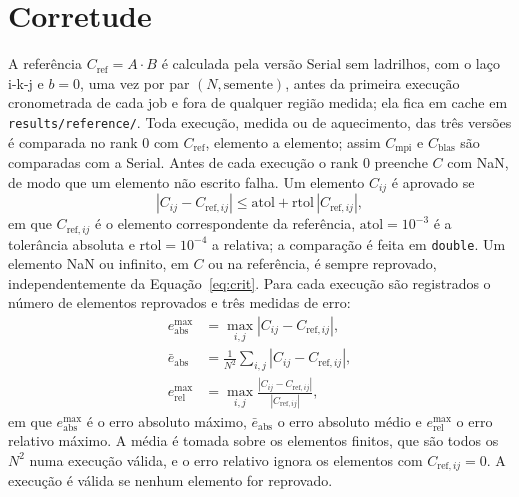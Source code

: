\documentclass[Portugues]{ic-tese-v3}
\DeclareRobustCommand{\_}{\textunderscore\allowbreak} %
\begin{document}
\section{Corretude}
A referência $C_{\mathrm{ref}} = A\cdot B$ é calculada pela versão Serial sem ladrilhos, com o laço i-k-j e $b=0$, uma vez por par $(N,\text{semente})$, antes da primeira execução cronometrada de cada job e fora de qualquer região medida; ela fica em cache em \texttt{results/reference/}. Toda execução, medida ou de aquecimento, das três versões é comparada no rank 0 com $C_{\mathrm{ref}}$, elemento a elemento; assim $C_{\mathrm{mpi}}$ e $C_{\mathrm{blas}}$ são comparadas com a Serial. Antes de cada execução o rank 0 preenche $C$ com NaN, de modo que um elemento não escrito falha. Um elemento $C_{ij}$ é aprovado se
\begin{equation}\label{eq:crit}
\left| C_{ij} - C_{\mathrm{ref},ij} \right| \le \mathrm{atol} + \mathrm{rtol}\, \left| C_{\mathrm{ref},ij} \right|,
\end{equation}
em que $C_{\mathrm{ref},ij}$ é o elemento correspondente da referência, $\mathrm{atol}=10^{-3}$ é a tolerância absoluta e $\mathrm{rtol}=10^{-4}$ a relativa; a comparação é feita em \texttt{double}. Um elemento NaN ou infinito, em $C$ ou na referência, é sempre reprovado, independentemente da Equação~\eqref{eq:crit}. Para cada execução são registrados o número de elementos reprovados e três medidas de erro:
\begin{align}
e^{\max}_{\mathrm{abs}} &= \max_{i,j} \left| C_{ij} - C_{\mathrm{ref},ij} \right|, \label{eq:eabs}\\
\bar{e}_{\mathrm{abs}} &= \frac{1}{N^2} \sum_{i,j} \left| C_{ij} - C_{\mathrm{ref},ij} \right|, \label{eq:emed}\\
e^{\max}_{\mathrm{rel}} &= \max_{i,j} \frac{\left| C_{ij} - C_{\mathrm{ref},ij} \right|}{\left| C_{\mathrm{ref},ij} \right|}, \label{eq:erel}
\end{align}
em que $e^{\max}_{\mathrm{abs}}$ é o erro absoluto máximo, $\bar{e}_{\mathrm{abs}}$ o erro absoluto médio e $e^{\max}_{\mathrm{rel}}$ o erro relativo máximo. A média é tomada sobre os elementos finitos, que são todos os $N^2$ numa execução válida, e o erro relativo ignora os elementos com $C_{\mathrm{ref},ij} = 0$. A execução é válida se nenhum elemento for reprovado.
\end{document}
